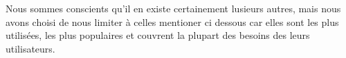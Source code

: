 Nous sommes conscients qu'il en existe certainement
lusieurs autres, mais nous avons choisi de nous limiter à celles mentioner ci dessous
car elles sont les plus utilisées, les plus populaires et couvrent la plupart des besoins
des leurs utilisateurs.